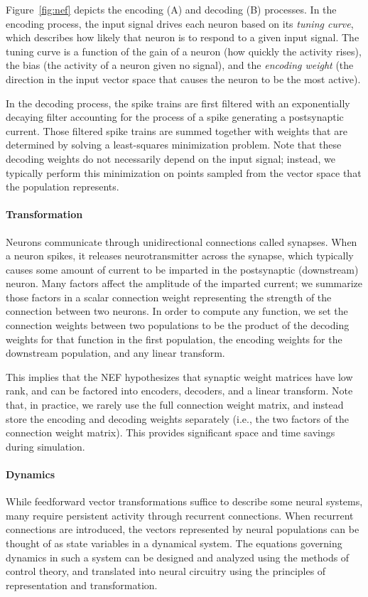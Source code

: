 \documentclass{frontiersSCNS}
\begin{document}
Figure~\ref{fig:nef} depicts
the encoding (A) and decoding (B) processes.
In the encoding process, the input signal drives
each neuron based on its \textit{tuning curve},
which describes how likely
that neuron is to respond to a given input signal.
The tuning curve is a function of the gain
of a neuron (how quickly the activity rises),
the bias (the activity of a neuron given no signal),
and the \textit{encoding weight}
(the direction in the input vector space
that causes the neuron to be the most active).

In the decoding process,
the spike trains are first filtered
with an exponentially decaying filter
accounting for the process
of a spike generating a postsynaptic current.
Those filtered spike trains are summed together
with weights that are determined
by solving a least-squares minimization problem.
Note that these decoding weights
do not necessarily depend on the input signal;
instead, we typically perform
this minimization on points
sampled from
the vector space
that the population represents.

\paragraph{Transformation}  %
Neurons communicate through
unidirectional connections called synapses.
When a neuron spikes,
it releases neurotransmitter across the synapse,
which typically causes some amount of current
to be imparted in the postsynaptic (downstream) neuron.
Many factors affect the
amplitude of the imparted current;
we summarize those factors
in a scalar connection weight
representing the strength
of the connection between two neurons.
In order to compute any function,
we set the connection weights between
two populations to be the product of
the decoding weights for that function
in the first population,
the encoding weights
for the downstream population,
and any linear transform.

This implies that the NEF hypothesizes
that synaptic weight matrices
have low rank, and can be factored
into encoders, decoders, and a linear transform.
Note that, in practice, we rarely use
the full connection weight matrix,
and instead store
the encoding and decoding weights separately
(i.e., the two factors of the connection weight matrix).
This provides significant
space and time savings during simulation.

\paragraph{Dynamics}
While feedforward vector transformations
suffice to describe
some neural systems,
many require persistent activity through recurrent connections.
When recurrent connections are introduced,
the vectors represented by neural populations
can be thought of as state variables
in a dynamical system.
The equations governing dynamics
in such a system
can be designed and analyzed
using the methods of control theory,
and translated into neural circuitry
using the principles
of representation and transformation.
\end{document}
